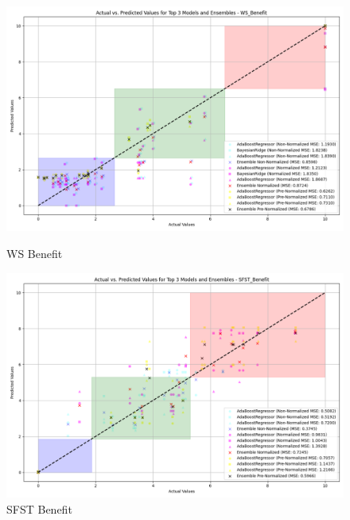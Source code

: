 \begin{figure}[H]
    \centering
    \begin{minipage}{0.45\textwidth}
        \centering
        \includegraphics[width=\linewidth]{reg_section_all/ensemble_learning/actual_vs_predicted_top_3_models_and_ensembles_WS_Benefit.png}
        \caption{WS Benefit}
        \label{reg_all_fig:ws_ben_ensemble}
    \end{minipage}\hfill
    \begin{minipage}{0.45\textwidth}
        \centering
        \includegraphics[width=\linewidth]{reg_section_all/ensemble_learning/actual_vs_predicted_top_3_models_and_ensembles_SFST_Benefit.png}
        \caption{SFST Benefit}
        \label{reg_all_fig:sfst_ben_ensemble}
    \end{minipage}
\end{figure}
